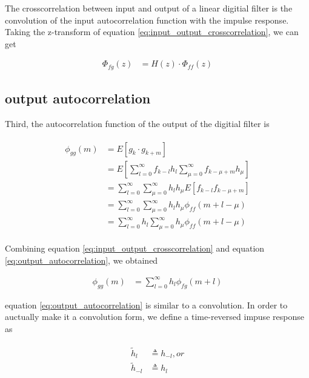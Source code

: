 \documentclass[8pt,a4paper]{article}
\begin{document}
\begin{multicols}{2}
The crosscorrelation between input and output of a linear digitial filter is the convolution of the input autocorrelation function with the impulse response.
Taking the z-transform of equation \ref{eq:input_output_crosscorrelation}, we can get 

\begin{align}
  \Phi_{fg}(z)&=H(z) \cdot \Phi_{ff}(z)
\end{align}

\subsection*{output autocorrelation}
Third, the autocorrelation function of the output of the digitial filter is

\begin{align}
  \label{eq:output_autocorrelation}
  \begin{split}
    \phi_{gg}(m)&= E \left[ g_{k} \cdot g_{k+m} \right] \\
                &= E \left[  \sum_{l=0}^{\infty} f_{k-l}h_{l} \sum_{\mu=0}^{\infty} f_{k-\mu+m}h_{\mu}  \right] \\
                &= \sum_{l=0}^{\infty} \sum_{\mu=0}^{\infty} h_{l} h_{\mu} E \left[ f_{k-l} f_{k-\mu +m} \right] \\
                &= \sum_{l=0}^{\infty} \sum_{\mu=0}^{\infty} h_{l} h_{\mu} \phi_{ff}(m+l-\mu) \\
                &= \sum_{l=0}^{\infty} h_{l} \sum_{\mu=0}^{\infty} h_{\mu} \phi_{ff}(m+l-\mu)
  \end{split}
\end{align}

Combining equation \ref{eq:input_output_crosscorrelation} and equation \ref{eq:output_autocorrelation}, we obtained

\begin{align}
  \label{eq:output_autocorrelation_2}
  \phi_{gg}(m) &= \sum_{l=0}^{\infty} h_{l} \phi_{fg}(m+l)
\end{align}

equation \ref{eq:output_autocorrelation} is similar to a convolution. In order to auctually make it a convolution form, we define a time-reversed impuse response as

\begin{align}
  \begin{split}
  \tilde{h}_{l} &\triangleq h_{-l}, or \\
  \tilde{h}_{-l} &\triangleq h_{l}
  \end{split}
\end{align}


\end{multicols}
\end{document}

